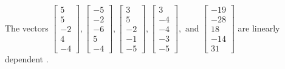 \begin{exercise}
\begin{exerciseStatement}
  \end{exerciseStatement}
  \begin{exerciseAnswer}
   The vectors \(\left[\begin{array}{r}
5 \\
5 \\
-2 \\
4 \\
-4
\end{array}\right] , \left[\begin{array}{r}
-5 \\
-2 \\
-6 \\
5 \\
-4
\end{array}\right] , \left[\begin{array}{r}
3 \\
5 \\
-2 \\
-1 \\
-5
\end{array}\right] , \left[\begin{array}{r}
3 \\
-4 \\
-4 \\
-3 \\
-5
\end{array}\right] , \text{ and } \left[\begin{array}{r}
-19 \\
-28 \\
18 \\
-14 \\
31
\end{array}\right]\) are 
  	 linearly dependent  .
  


  \end{exerciseAnswer}
\end{exercise}